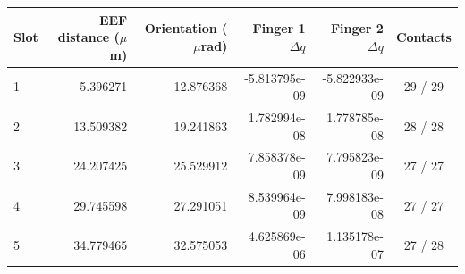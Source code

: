 \par\medskip\noindent\begin{minipage}{\textwidth}
\makeatletter{}\makeatother
\centering
\caption{Shared minus random at all five times. Together with Table~S4, these are all 15 pair--time observations of the same three trajectories, not 15 independent samples. Joint differences retain simulator units; contacts are S / R.}
\label{tab:physical-SR}
\begin{tabular}{@{}lrrrrc@{}}\toprule
Slot & EEF distance ($\mu$m) & Orientation ($\mu$rad) & Finger 1 $\Delta q$ & Finger 2 $\Delta q$ & Contacts\\\midrule
1 & 5.396271 & 12.876368 & -5.813795e-09 & -5.822933e-09 & 29 / 29\\
2 & 13.509382 & 19.241863 & 1.782994e-08 & 1.778785e-08 & 28 / 28\\
3 & 24.207425 & 25.529912 & 7.858378e-09 & 7.795823e-09 & 27 / 27\\
4 & 29.745598 & 27.291051 & 8.539964e-09 & 7.998183e-08 & 27 / 27\\
5 & 34.779465 & 32.575053 & 4.625869e-06 & 1.135178e-07 & 27 / 28\\
\bottomrule
\end{tabular}
\end{minipage}\par\medskip
